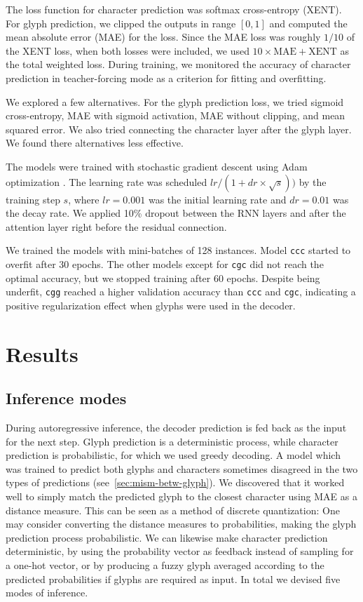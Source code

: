 \documentclass[11pt,twocolumn]{article}
\begin{document}
The loss function for character prediction was softmax cross-entropy (XENT).
For glyph prediction, we clipped the outputs in range \([0,1]\)
and computed the mean absolute error (MAE) for the loss.
Since the MAE loss was roughly \(1/10\) of the XENT loss,
when both losses were included,
we used \(10 \times \mathrm{MAE} + \mathrm{XENT}\) as the total weighted loss.
During training,
we monitored the accuracy of character prediction in teacher-forcing mode
as a criterion for fitting and overfitting.

We explored a few alternatives.
For the glyph prediction loss,
we tried sigmoid cross-entropy,
MAE with sigmoid activation,
MAE without clipping,
and mean squared error.
We also tried connecting the character layer after the glyph layer.
We found there alternatives less effective.

The models were trained with stochastic gradient descent using Adam optimization \parencite{kingma2014adam}.
The learning rate was scheduled \(lr / \left( 1 + dr \times \sqrt{s} \right))\) by the training step \(s\),
where \(lr = 0.001\) was the initial learning rate
and \(dr = 0.01\) was the decay rate.
We applied 10\% dropout \parencite{srivastava2014dropout} between the RNN layers
and after the attention layer right before the residual connection.

We trained the models with mini-batches of 128 instances.
Model \texttt{ccc} started to overfit after 30 epochs.
The other models except for \texttt{cgc} did not reach the optimal accuracy,
but we stopped training after 60 epochs.
Despite being underfit, \texttt{cgg} reached a higher validation accuracy than \texttt{ccc} and \texttt{cgc},
indicating a positive regularization effect when glyphs were used in the decoder.

\section{Results}\label{sec:results}

\subsection{Inference modes}\label{sec:inference-modes}

During autoregressive inference, the decoder prediction is fed back as the input for the next step.
Glyph prediction is a deterministic process,
while character prediction is probabilistic,
for which we used greedy decoding.
A model which was trained to predict both glyphs and characters
sometimes disagreed in the two types of predictions (see~\ref{sec:mism-betw-glyph}).
We discovered that it worked well to simply match the predicted glyph to the closest character
using MAE as a distance measure.
This can be seen as a method of discrete quantization:
One may consider converting the distance measures to probabilities,
making the glyph prediction process probabilistic.
We can likewise make character prediction deterministic,
by using the probability vector as feedback instead of sampling for a one-hot vector,
or by producing a fuzzy glyph averaged according to the predicted probabilities if glyphs are required as input.
In total we devised five modes of inference.
\end{document}
